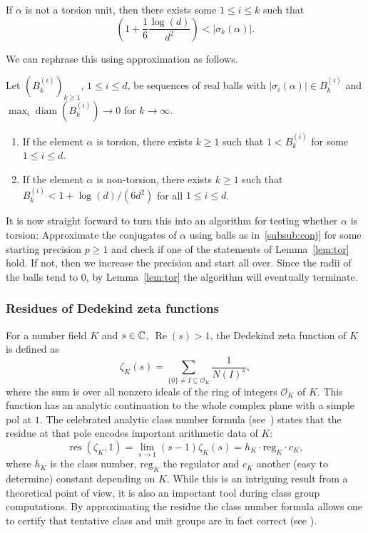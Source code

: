\documentclass{sig-alternate-05-2015}
\begin{document}
\begin{lemma}
If $\alpha$ is not a torsion unit, then there exists some $1 \leq i \leq k$ such that
\[ \left(1 + \frac 1 6 \frac{\log(d)}{d^2} \right) < \lvert \sigma_k(\alpha) \rvert. \]
\end{lemma}

We can rephrase this using approximation as follows.

\begin{lemma}\label{lem:tor}
  Let $(B^{(i)}_k)_{k \geq 1}$, $1 \leq i \leq d$, be sequences of real balls with $\lvert \sigma_i(\alpha) \rvert \in B^{(i)}_k$ and $\max_i\operatorname{diam}(B_k^{(i)}) \to 0$ for $k \to \infty$.
  \begin{enumerate}
  \item
    If the element $\alpha$ is torsion, there exists $k \geq 1$ such that $1 < B_k^{(i)}$ for some $1 \leq i \leq d$.
  \item
    If the element $\alpha$ is non-torsion, there exists $k \geq 1$ such that $B_k^{(i)} < 1 + \log(d)/(6d^2)$ for all $1 \leq i \leq d$.
  \end{enumerate}
\end{lemma}

It is now straight forward to turn this into an algorithm for testing whether $\alpha$ is torsion: Approximate the conjugates of $\alpha$ using balls as in~\ref{subsub:conj} for some starting precision $p \geq 1$ and check if one of the statements of Lemma~\ref{lem:tor} hold.
If not, then we increase the precision and start all over.
Since the radii of the balls tend to $0$, by Lemma~\ref{lem:tor} the algorithm will eventually terminate.

\subsubsection{Residues of Dedekind zeta functions}

For a number field $K$ and $s \in \mathbb{C}$, $\operatorname{Re}(s) > 1$, the Dedekind zeta function of $K$ is defined as
\[ \zeta_K(s) = \sum_{\{0\} \neq I \subseteq \mathcal O_K} \frac 1 {N(I)^s}, \]
where the sum is over all nonzero ideals of the ring of integers $\mathcal O_K$ of $K$.
This function has an analytic continuation to the whole complex plane with a simple pol at $1$. The celebrated analytic class number formula (see~\cite{Cohen1993}) states that the residue at that pole encodes important arithmetic data of $K$:
\[ \operatorname{res}(\zeta_K, 1) =\lim_{s \to 1}(s - 1)\zeta_K(s) = h_K \cdot \mathrm{reg}_K \cdot c_K, \]
where $h_K$ is the class number, $\mathrm{reg}_K$ the regulator and $c_K$ another (easy to determine) constant depending on $K$.
While this is an intriguing result from a theoretical point of view, it is also an important tool during class group computations.
By approximating the residue the class number formula allows one to certify that tentative class and unit groups are in fact correct (see \cite{Biasse2014}).
\end{document}
